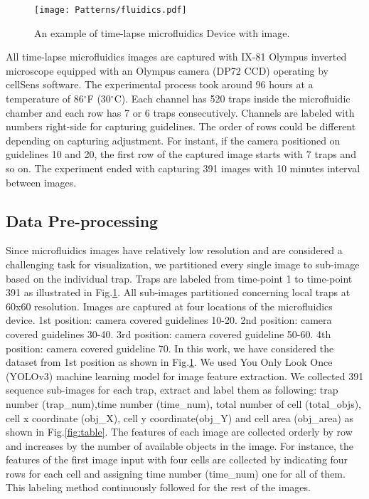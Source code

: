 \documentclass[conference]{IEEEtran}
\begin{document}
\begin{figure}
\centering
\texttt{[image: Patterns/fluidics.pdf]}
\caption{ An example of time-lapse microfluidics Device with image.}
\label{fig:micro}
\end{figure}

All time-lapse microfluidics images are captured with IX-81 Olympus inverted microscope equipped with an Olympus camera (DP72 CCD) operating by cellSens software. The experimental process took around 96 hours at a temperature of 86$^{\circ}$F (30$^{\circ}$C). Each channel has 520 traps inside the microfluidic chamber and each row has 7 or 6 traps consecutively. Channels are labeled with numbers right-side for capturing guidelines. The order of rows could be different depending on capturing adjustment. For instant, if the camera positioned on guidelines 10 and 20, the first row of the captured image starts with 7 traps and so on. The experiment ended with capturing 391 images with 10 minutes interval between images. 

\subsection{Data Pre-processing}
Since microfluidics images have relatively low resolution and are considered a challenging task for visualization, we partitioned every single image to sub-image based on the individual trap. Traps are labeled from time-point 1 to time-point 391 as illustrated in Fig.\ref{fig:micro}. All sub-images partitioned concerning local traps at 60x60 resolution. Images are captured at four locations of the microfluidics device. 1st position: camera covered guidelines 10-20. 2nd position: camera covered guidelines 30-40. 3rd position: camera covered guideline 50-60. 4th position: camera covered guideline 70. In this work, we have considered the dataset from 1st position as shown in Fig.\ref{fig:micro}. We used You Only Look Once (YOLOv3) \cite{ref20} machine learning model for image feature extraction. We collected 391 sequence sub-images for each trap, extract and label them as following: trap number (trap\_num),time number (time\_num), total number of cell (total\_objs), cell x coordinate (obj\_X), cell y coordinate(obj\_Y) and cell area (obj\_area) as shown in Fig.\ref{fig:table}. The features of each image are collected orderly by row and increases by the number of available objects in the image. For instance, the features of the first image input with four cells are collected by indicating four rows for each cell and assigning time number (time\_num) one for all of them. This labeling method continuously followed for the rest of the images.
\end{document}
